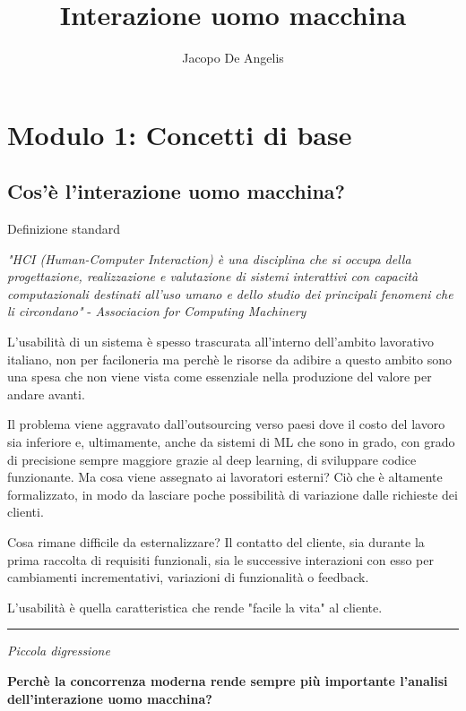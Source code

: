 \documentclass[11pt,a4paper]{book}
\begin{document}
\title{Interazione uomo macchina}
\author{Jacopo De Angelis}
\maketitle

\pagebreak
\tableofcontents
\pagebreak

\chapter{Modulo 1: Concetti di base}
\section{Cos'è l'interazione uomo macchina?}
\begin{center}
Definizione standard 

\textit{"HCI (Human-Computer Interaction) è una disciplina che si occupa della progettazione, realizzazione e valutazione di sistemi interattivi con capacità computazionali destinati all'uso umano e dello studio dei principali fenomeni che li circondano"} - \textit{Associacion for Computing Machinery}
\end{center}

L'usabilità di un sistema è spesso trascurata all'interno dell'ambito lavorativo italiano, non per faciloneria ma perchè le risorse da adibire a questo ambito sono una spesa che non viene vista come essenziale nella produzione del valore per andare avanti. 

Il problema viene aggravato dall'outsourcing verso paesi dove il costo del lavoro sia inferiore e, ultimamente, anche da sistemi di ML che sono in grado, con grado di precisione sempre maggiore grazie al deep learning, di sviluppare codice funzionante. Ma cosa viene assegnato ai lavoratori esterni? Ciò che è altamente formalizzato, in modo da lasciare poche possibilità di variazione dalle richieste dei clienti.

Cosa rimane difficile da esternalizzare? Il contatto del cliente, sia durante la prima raccolta di requisiti funzionali, sia le successive interazioni con esso per cambiamenti incrementativi, variazioni di funzionalità o feedback.

L'usabilità è quella caratteristica che rende "facile la vita" al cliente.

\noindent\rule{\textwidth}{1pt}
\begin{center}
\textit{Piccola digressione}
\end{center}
\textbf{Perchè la concorrenza moderna rende sempre più importante l'analisi dell'interazione uomo macchina?}
\end{document}
